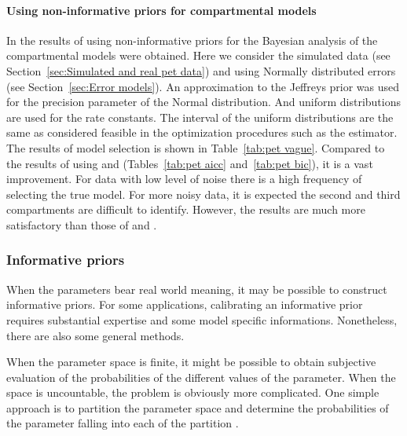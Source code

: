 \paragraph{Using non-informative priors for \pet compartmental models}

In \cite{Zhou2013} the results of using non-informative priors for the
Bayesian analysis of the \pet compartmental models were obtained. Here we
consider the simulated data (see Section~\ref{sec:Simulated and real pet
  data}) and using Normally distributed errors (see Section~\ref{sec:Error
  models}). An approximation to the Jeffreys prior was used for the precision
parameter of the Normal distribution. And uniform distributions are used for
the rate constants. The interval of the uniform distributions are the same as
considered feasible in the optimization procedures such as the \nls estimator.
The results of model selection is shown in Table~\ref{tab:pet vague}. Compared
to the results of using \aicc and \bic (Tables~\ref{tab:pet aicc}
and~\ref{tab:pet bic}), it is a vast improvement. For data with low level of
noise there is a high frequency of selecting the true model. For more noisy
data, it is expected the second and third compartments are difficult to
identify. However, the results are much more satisfactory than those of \aicc
and \bic.



\subsubsection{Informative priors}
\label{ssub:Informative priors}

When the parameters bear real world meaning, it may be possible to construct
informative priors. For some applications, calibrating an informative prior
requires substantial expertise and some model specific informations.
Nonetheless, there are also some general methods.

When the parameter space is finite, it might be possible to obtain subjective
evaluation of the probabilities of the different values of the parameter. When
the space is uncountable, the problem is obviously more complicated. One
simple approach is to partition the parameter space and determine the
probabilities of the parameter falling into each of the partition
\cite[][sec.~3.2.2]{Robert:2007tc}.

